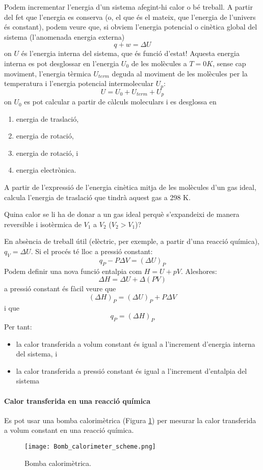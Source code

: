 Podem incrementar l'energia d'un sistema afegint-hi calor o bé treball. A partir del fet que l'energia es conserva (o, el que és el mateix, que l'energia de l'univers és constant), podem veure que, si obviem l'energia potencial o cinètica global del sistema (l'anomenada energia externa) 
\[
q+w=\Delta U
\]
on $U$ és l'energia interna del sistema, que és funció d'estat!
Aquesta energia interna es pot desglossar en l'energia $U_0$ de les molècules a $T=0K$, sense cap moviment, l'energia tèrmica $U_{term}$ deguda al moviment de les molècules per la temperatura i l'energia potencial intermolecular $U_p$:
\[
U=U_0+U_{term}+U_p
\]
on $U_0$ es pot calcular a partir de càlculs moleculars i es desglossa en 
\begin{enumerate}
\item energia de traslació,
\item energia de rotació,
\item energia de rotació, i 
\item energia electrònica.
\end{enumerate}
\begin{exr}
A partir de l'expressió de l'energia cinètica mitja de les molècules d'un gas ideal, calcula l'energia de traslació que tindrà aquest gas a 298 K.
\end{exr}
\begin{exr}
Quina calor se li ha de donar a un gas ideal perquè s'expandeixi de manera reversible i isotèrmica de $V_1$ a $V_2$ ($V_2>V_1$)?
\end{exr}
En absència de treball útil (elèctric, per exemple, a partir d'una reacció química), $q_V=\Delta U$.
Si el procés té lloc a pressió constant:
\[
q_P  -P\Delta V = (\Delta U)_P
\]
Podem definir una nova funció entalpia com $H=U+pV$.
Aleshores:
\[
\Delta H = \Delta U + \Delta(PV)
\]
a pressió constant és fàcil veure que
\[
(\Delta H)_P = (\Delta U)_P + P\Delta V
\]
i que 
\[
q_P=(\Delta H)_P 
\]
Per tant:
\begin{itemize}
\item la calor transferida a volum constant és igual a l'increment d'energia interna del sistema, i
\item la calor transferida a pressió constant és igual a l'increment d'entalpia  del sistema
\end{itemize}

\paragraph{Calor transferida en una reacció química}
Es pot usar una bomba calorimètrica (Figura \ref{fig:Bomb_calorimeter_scheme}) per mesurar la calor transferida a volum constant en una reacció química.
\begin{figure}[h]
\centering
\texttt{[image: Bomb\_calorimeter\_scheme.png]}
\caption{Bomba calorimètrica.}
\label{fig:Bomb_calorimeter_scheme}
\end{figure}

